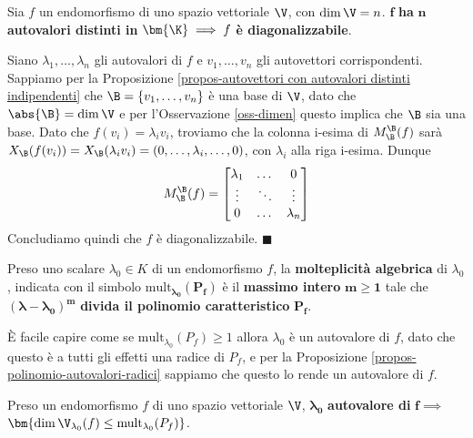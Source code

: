 \documentclass[11pt, a4paper, titlepage, oneside]{scrbook}
\begin{document}
\begin{Proposizione}[]
\label{propos-f-con-n-autovalori-diagonalizzabile}
Sia $f$ un endomorfismo di uno spazio vettoriale $\V$, con $\dim \V = n$. $\bm{f}$ \textbf{ha} $\bm{n}$ \textbf{autovalori distinti in} $\bm{\K} \implies f$ \textbf{è diagonalizzabile}. 
\end{Proposizione}

\Dimostrazione \nopagebreak

Siano $\lambda_1, \ldots, \lambda_n$ gli autovalori di $f$ e $v_1, \ldots, v_n$ gli autovettori corrispondenti. Sappiamo per la Proposizione \ref{propos-autovettori con autovalori distinti indipendenti} che $\B = \{v_1, \ldots, v_n\}$ è una base di $\V$, dato che $\abs{\B} = \dim \V$ e per l'Osservazione \ref{oss-dimen} questo implica che $\B$ sia una base. Dato che $f(v_i) = \lambda_i v_i$, troviamo che la colonna i-esima di $M_\B^\B(f)$ sarà $X_\B(f(v_i)) = X_\B(\lambda_i v_i) = (0,\ldots, \lambda_i, \ldots, 0)$, con $\lambda_i$ alla riga i-esima. Dunque 
\[
M_\B^\B(f) = \begin{bmatrix}
    \lambda_1 & \dots & 0 \\
    \vdots & \ddots & \vdots \\
    0 & \dots & \lambda_n
\end{bmatrix}
\]
Concludiamo quindi che $f$ è diagonalizzabile. $\blacksquare$

\begin{Definizione}
\label{def-molteplicità}
Preso uno scalare $\lambda_0 \in K$ di un endomorfismo $f$, la \textbf{molteplicità algebrica} di $\lambda_0$, indicata con il simbolo $\bm{\mathrm{mult}_{\lambda_0}(P_f)}$ è il \textbf{massimo intero} $\bm{m \geq 1}$ tale che $\bm{(\lambda - \lambda_0)^m}$ \textbf{divida il polinomio caratteristico} $\bm{P_f}$. 
\end{Definizione}
È facile capire come se $\mathrm{mult}_{\lambda_0}(P_f) \geq 1$ allora $\lambda_0$ è un autovalore di $f$, dato che questo è a tutti gli effetti una radice di $P_f$, e per la Proposizione \ref{propos-polinomio-autovalori-radici} sappiamo che questo lo rende un autovalore di $f$.

\begin{Proposizione}[]
\label{propos-dim V < mult}
Preso un endomorfismo $f$ di uno spazio vettoriale $\V$, $\bm{\lambda_0}$ \textbf{autovalore di} $\bm{f} \implies$ \mbox{$\bm{\dim \V_{\lambda_0}(f) \leq \mathrm{mult}_{\lambda_0}(P_f)}$}.
\end{Proposizione}
\end{document}
